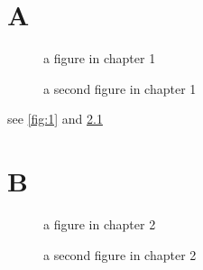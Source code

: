 \documentclass{book}
\begin{document}
\chapter{A}
\begin{figure}
\caption{a figure in chapter 1}\label{fig:1}
\end{figure}

\begin{figure}
\caption{a second figure in chapter 1}
\end{figure}

see \autoref{fig:1} and \ref{fig:2}

\chapter{B}
\begin{figure}
\caption{a figure in chapter 2}
\end{figure}

\begin{figure}
\caption{a second figure in chapter 2}\label{fig:2}
\end{figure}
\end{document}

